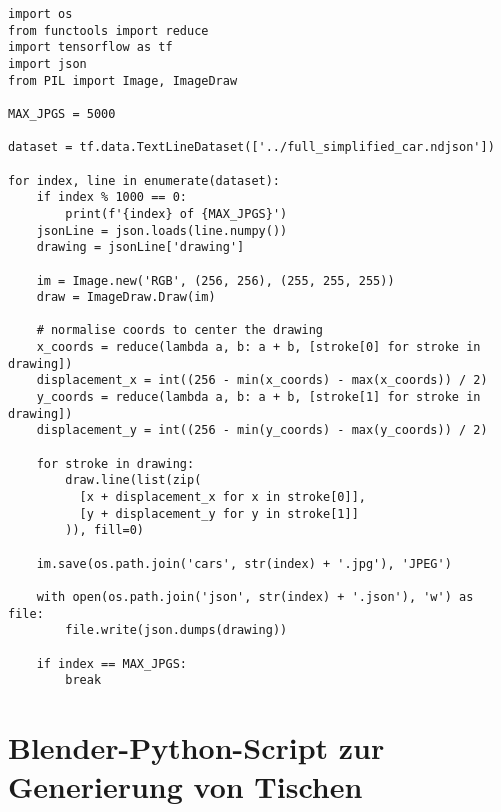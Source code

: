 \begin{lstlisting}
import os
from functools import reduce
import tensorflow as tf
import json
from PIL import Image, ImageDraw

MAX_JPGS = 5000

dataset = tf.data.TextLineDataset(['../full_simplified_car.ndjson'])

for index, line in enumerate(dataset):
    if index % 1000 == 0:
        print(f'{index} of {MAX_JPGS}')
    jsonLine = json.loads(line.numpy())
    drawing = jsonLine['drawing']

    im = Image.new('RGB', (256, 256), (255, 255, 255))
    draw = ImageDraw.Draw(im)

    # normalise coords to center the drawing
    x_coords = reduce(lambda a, b: a + b, [stroke[0] for stroke in drawing])
    displacement_x = int((256 - min(x_coords) - max(x_coords)) / 2)
    y_coords = reduce(lambda a, b: a + b, [stroke[1] for stroke in drawing])
    displacement_y = int((256 - min(y_coords) - max(y_coords)) / 2)

    for stroke in drawing:
        draw.line(list(zip(
          [x + displacement_x for x in stroke[0]],
          [y + displacement_y for y in stroke[1]]
        )), fill=0)

    im.save(os.path.join('cars', str(index) + '.jpg'), 'JPEG')

    with open(os.path.join('json', str(index) + '.json'), 'w') as file:
        file.write(json.dumps(drawing))

    if index == MAX_JPGS:
        break
\end{lstlisting}
\vfill

\pagebreak

\section{Blender-Python-Script zur Generierung von Tischen}
\label{blenderpy}

